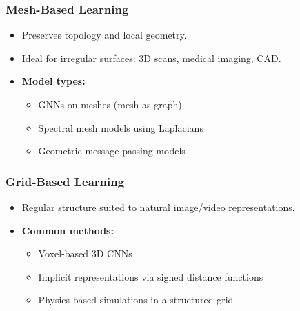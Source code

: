 \begin{frame}[fragile]\frametitle{Mesh-Based Learning}
  \begin{itemize}
    \item Preserves topology and local geometry.
    \item Ideal for irregular surfaces: 3D scans, medical imaging, CAD.
    \item \textbf{Model types:}
    \begin{itemize}
      \item GNNs on meshes (mesh as graph)
      \item Spectral mesh models using Laplacians
      \item Geometric message-passing models
    \end{itemize}
  \end{itemize}
\end{frame}

\begin{frame}[fragile]\frametitle{Grid-Based Learning}
  \begin{itemize}
    \item Regular structure suited to natural image/video representations.
    \item \textbf{Common methods:}
    \begin{itemize}
      \item Voxel-based 3D CNNs
      \item Implicit representations via signed distance functions
      \item Physics-based simulations in a structured grid
    \end{itemize}
  \end{itemize}
\end{frame}

